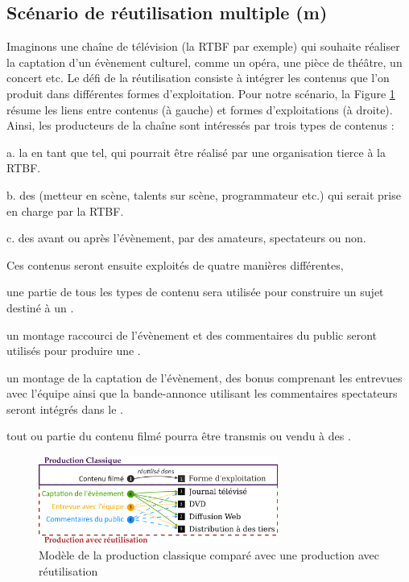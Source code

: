 \subsection{Scénario de réutilisation multiple (m)}\label{sec:ex-reuse}
Imaginons une chaîne de télévision (la RTBF par exemple) qui souhaite réaliser la captation d'un évènement culturel, comme un opéra, une pièce de théâtre, un concert etc. 
Le défi de la réutilisation consiste à intégrer les contenus que l'on produit dans différentes formes d'exploitation. 
Pour notre scénario, la Figure \ref{img:reuse} résume les liens entre contenus (à gauche) et formes d'exploitations (à droite). 
Ainsi, les producteurs de la chaîne sont intéressés par trois types de contenus :
\begin{liste}
	\item[a.] la  en tant que tel, qui pourrait être réalisé par une organisation tierce à la RTBF.
	\item[b.] des  (metteur en scène, talents sur scène, programmateur etc.) qui serait prise en charge par la RTBF. 
	\item[c.] des  avant ou après l'évènement, par des amateurs, spectateurs ou non.\\
\end{liste}

Ces contenus seront ensuite exploités de quatre manières différentes, 
\begin{listenum}
	\item une partie de tous les types de contenu sera utilisée pour construire un sujet destiné à un . 
	\item un montage raccourci de l'évènement et des commentaires du public seront utilisés pour produire une .
	\item un montage de la captation de l'évènement, des bonus comprenant les entrevues avec l'équipe ainsi que la bande-annonce utilisant les commentaires spectateurs seront intégrés dans le .	 
	\item tout ou partie du contenu filmé pourra être transmis ou vendu à des . 
\end{listenum}

\begin{figure}[ht!]
\centering
\includegraphics[width=0.7\textwidth]{images/UC-Tahnhauser-v1fr.png}
\caption{Modèle de la production classique comparé avec une production avec réutilisation}
\label{img:reuse}
\end{figure}


